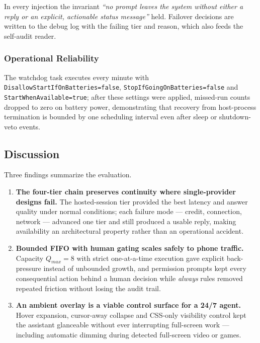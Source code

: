 \documentclass[conference]{IEEEtran}
\begin{document}
In every injection the invariant \emph{``no prompt leaves the
system without either a reply or an explicit, actionable status
message''} held. Failover decisions are written to the debug log
with the failing tier and reason, which also feeds the
self-audit reader.

\subsubsection{Operational Reliability}

The watchdog task executes every minute with
\texttt{DisallowStartIfOnBatteries=false},
\texttt{StopIfGoingOnBatteries=false} and
\texttt{StartWhenAvailable=true}; after these settings were
applied, missed-run counts dropped to zero on battery power,
demonstrating that recovery from host-process termination is
bounded by one scheduling interval even after sleep or
shutdown-veto events.

\subsection{Discussion}

Three findings summarize the evaluation.

\begin{enumerate}
  \item \textbf{The four-tier chain preserves continuity where
  single-provider designs fail.} The hosted-session tier
  provided the best latency and answer quality under normal
  conditions; each failure mode --- credit, connection, network
  --- advanced one tier and still produced a usable reply,
  making availability an architectural property rather than an
  operational accident.
  \item \textbf{Bounded FIFO with human gating scales safely to
  phone traffic.} Capacity $Q_{max}=8$ with strict one-at-a-time
  execution gave explicit back-pressure instead of unbounded
  growth, and permission prompts kept every consequential action
  behind a human decision while \emph{always} rules removed
  repeated friction without losing the audit trail.
  \item \textbf{An ambient overlay is a viable control surface
  for a 24/7 agent.} Hover expansion, cursor-away collapse and
  CSS-only visibility control kept the assistant glanceable
  without ever interrupting full-screen work --- including
  automatic dimming during detected full-screen video or games.
\end{enumerate}
\end{document}
